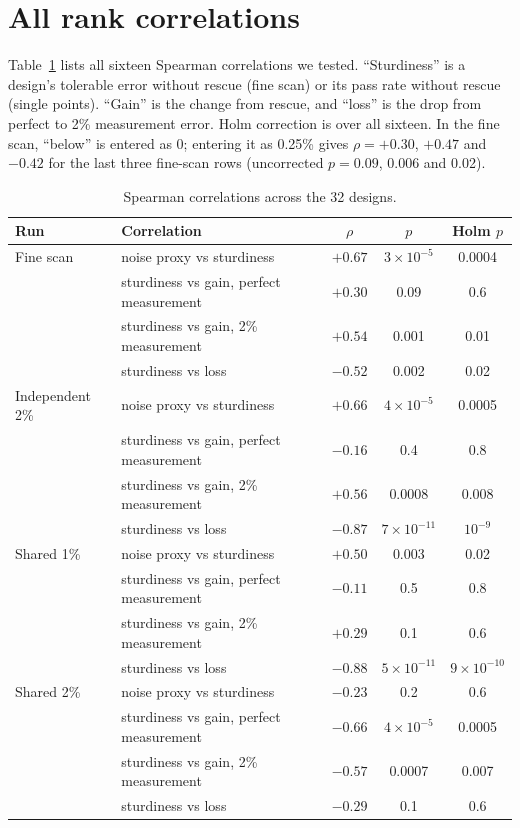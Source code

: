 \appendix
\section{All rank correlations}
\label{app:corr}

Table~\ref{tab:corr} lists all sixteen Spearman correlations we tested. ``Sturdiness'' is a design's tolerable error without rescue (fine scan) or its pass rate without rescue (single points). ``Gain'' is the change from rescue, and ``loss'' is the drop from perfect to 2\% measurement error. Holm correction is over all sixteen. In the fine scan, ``below'' is entered as 0; entering it as 0.25\% gives $\rho = +0.30$, $+0.47$ and $-0.42$ for the last three fine-scan rows (uncorrected $p = 0.09$, 0.006 and 0.02).

\begin{table}[h]
\centering
\caption{Spearman correlations across the 32 designs.}
\label{tab:corr}
\footnotesize
\begin{tabular}{llccc}
\toprule
Run & Correlation & $\rho$ & $p$ & Holm $p$ \\
\midrule
Fine scan & noise proxy vs sturdiness & $+0.67$ & $3\times10^{-5}$ & 0.0004 \\
 & sturdiness vs gain, perfect measurement & $+0.30$ & 0.09 & 0.6 \\
 & sturdiness vs gain, 2\% measurement & $+0.54$ & 0.001 & 0.01 \\
 & sturdiness vs loss & $-0.52$ & 0.002 & 0.02 \\
Independent 2\% & noise proxy vs sturdiness & $+0.66$ & $4\times10^{-5}$ & 0.0005 \\
 & sturdiness vs gain, perfect measurement & $-0.16$ & 0.4 & 0.8 \\
 & sturdiness vs gain, 2\% measurement & $+0.56$ & 0.0008 & 0.008 \\
 & sturdiness vs loss & $-0.87$ & $7\times10^{-11}$ & $10^{-9}$ \\
Shared 1\% & noise proxy vs sturdiness & $+0.50$ & 0.003 & 0.02 \\
 & sturdiness vs gain, perfect measurement & $-0.11$ & 0.5 & 0.8 \\
 & sturdiness vs gain, 2\% measurement & $+0.29$ & 0.1 & 0.6 \\
 & sturdiness vs loss & $-0.88$ & $5\times10^{-11}$ & $9\times10^{-10}$ \\
Shared 2\% & noise proxy vs sturdiness & $-0.23$ & 0.2 & 0.6 \\
 & sturdiness vs gain, perfect measurement & $-0.66$ & $4\times10^{-5}$ & 0.0005 \\
 & sturdiness vs gain, 2\% measurement & $-0.57$ & 0.0007 & 0.007 \\
 & sturdiness vs loss & $-0.29$ & 0.1 & 0.6 \\
\bottomrule
\end{tabular}
\end{table}
